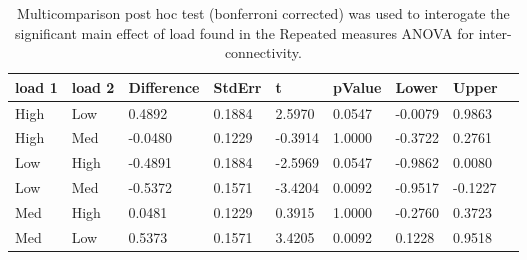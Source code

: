 \begin{table}
\centering
\begin{tabular}[0.2em]{@{}lllllllll@{}}\toprule
load 1 & load 2 & Difference & StdErr & t & pValue & Lower & Upper\\\toprule[0.2em]
High & Low & 0.4892 & 0.1884 & 2.5970 & 0.0547 & -0.0079 & 0.9863 \\\midrule
High & Med & -0.0480 & 0.1229 & -0.3914 & 1.0000 & -0.3722 & 0.2761 \\\midrule
Low & High & -0.4891 & 0.1884 & -2.5969 & 0.0547 & -0.9862 & 0.0080 \\\midrule
Low & Med & -0.5372 & 0.1571 & -3.4204 & 0.0092 & -0.9517 & -0.1227 \\\midrule
Med & High & 0.0481 & 0.1229 & 0.3915 & 1.0000 & -0.2760 & 0.3723 \\\midrule
Med & Low & 0.5373 & 0.1571 & 3.4205 & 0.0092 & 0.1228 & 0.9518 \\\bottomrule[0.2em]
\end{tabular}
\caption{Multicomparison post hoc test (bonferroni corrected) was used to interogate the significant main effect of load found in the Repeated measures ANOVA for inter-connectivity.\label{tabel:tbl_RMABA1_PH_load}}
\end{table}

